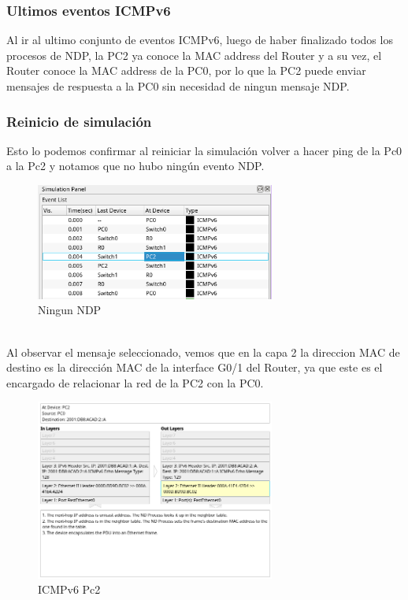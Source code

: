 \documentclass[a4paper,12pt]{article}
\begin{document}
\FloatBarrier
\subsubsection{Ultimos eventos ICMPv6}
Al ir al ultimo conjunto de eventos ICMPv6, luego de haber finalizado todos los procesos de NDP, la PC2 ya conoce la MAC address del Router y a su vez, el Router conoce la MAC address de la PC0, por lo que la PC2 puede enviar mensajes de respuesta a la PC0 sin necesidad de ningun mensaje NDP.\\
\subsubsection{Reinicio de simulación}
Esto lo podemos confirmar al reiniciar la simulación volver a hacer ping de la Pc0 a la Pc2 y notamos que no hubo ningún evento NDP. \\
\begin{figure}[h]
    \centering
    \includegraphics[width=0.7\textwidth]{imagenes/6.png}
    \caption{Ningun NDP}
\end{figure}\\
\FloatBarrier
Al observar el mensaje seleccionado, vemos que en la capa 2 la direccion MAC de destino es la dirección MAC de la interface G0/1 del Router, ya que este es el encargado de relacionar la red de la PC2 con la PC0.
\begin{figure}[h]
    \centering
    \includegraphics[width=0.7\textwidth]{imagenes/7.png}
    \caption{ICMPv6 Pc2}
\end{figure}\\
\FloatBarrier
\end{document}
